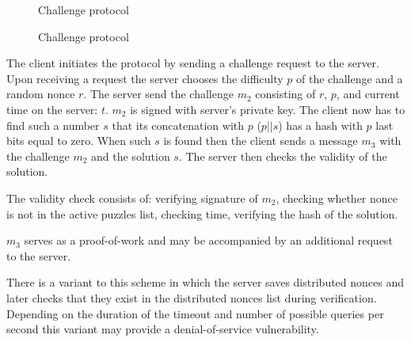 \begin{figure}
\begin{msc}{Challenge protocol}
\setlength{\instdist}{9cm}
\setlength{\envinstdist}{3cm}
\nextlevel
{}
\nextlevel[6]
\nextlevel[1]
\nextlevel[5]
\nextlevel
{}
\nextlevel[5]
\end{msc}
  \caption{Challenge protocol}
  \label{fig:chal_prot}
\end{figure}

The client initiates the protocol by sending a challenge request to the server. 
Upon receiving a request the server chooses the difficulty $p$ of the challenge
and a random nonce $r$. The server send the challenge $m_2$ consisting of $r$,
$p$, and current time on the server: $t$. $m_2$ is signed with server's private
key.  The client now has to find such a number $s$ that its concatenation with
$p$ ($p || s$) has a hash with $p$ last bits equal to zero. When such $s$ is
found then the client sends a message $m_3$ with the challenge $m_2$ and the
solution $s$. The server then checks the validity of the solution.

The validity check consists of: verifying signature of $m_2$, checking whether
nonce is not in the active puzzles list, checking time, verifying the hash of
the solution.

$m_3$ serves as a proof-of-work and may be accompanied by an additional request
to the server.

There is a variant to this scheme in which the server saves distributed nonces
and later checks that they exist in the distributed nonces list during
verification. Depending on the duration of the timeout and number of possible
queries per second this variant may provide a denial-of-service vulnerability.

